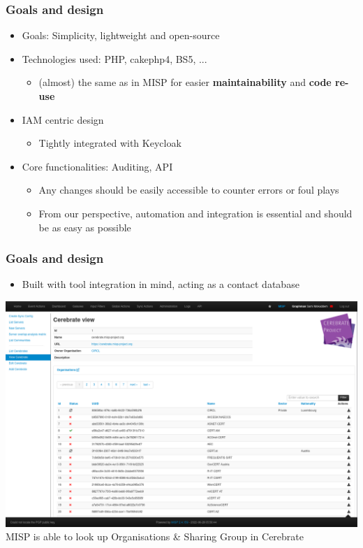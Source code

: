 \begin{frame}
\frametitle{Goals and design}
    \begin{itemize}
        \item Goals: Simplicity, lightweight and open-source
        \item Technologies used: PHP, cakephp4, BS5, ...
            \begin{itemize}
                \item (almost) the same as in MISP for easier \textbf{maintainability} and \textbf{code re-use}
            \end{itemize}
        \item IAM centric design
            \begin{itemize}
                \item Tightly integrated with Keycloak
            \end{itemize}
        \item Core functionalities: Auditing, API
            \begin{itemize}
                \item Any changes should be easily accessible to counter errors or foul plays
                \item From our perspective, automation and integration is essential and should be as easy as possible
            \end{itemize}
    \end{itemize}
\end{frame}

\begin{frame}
\frametitle{Goals and design}
    \begin{itemize}
        \item Built with tool integration in mind, acting as a contact database
    \end{itemize}
    \begin{center}
        \includegraphics[width=0.85\linewidth]{pictures/misp-cerebrate.png}\\

        MISP is able to look up Organisations \& Sharing Group in Cerebrate
    \end{center}
\end{frame}

